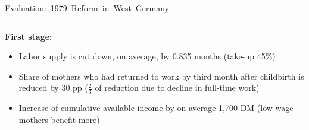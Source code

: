 \documentclass[aspectratio=169,handout]{beamer} %
\begin{document}
\begin{frame}{\mbox{Evaluation: 1979 Reform in West Germany}}
\begin{columns}
\begin{column}{.40\textwidth}
\begin{itemize}
		\end{itemize}
	\end{column}%
	\hfill
	
\normalsize
\end{columns}\pause
\vspace{0.5 em}
\textbf{First stage:}
\begin{itemize}
\item Labor supply is cut down, on average, by 0.835 months (take-up 45\%)
\item Share of mothers who had returned to work by third month after childbirth is reduced by 30 pp ($\tfrac{2}{3}$ of reduction due to decline in full-time work)
\item Increase of cumulative available income by on average 1,700 DM (low wage mothers benefit more)
\end{itemize}
\end{frame}
\end{document}
